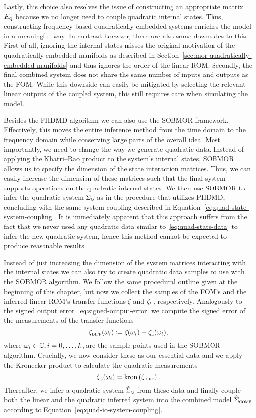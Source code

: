Lastly, this choice also resolves the issue of constructing an appropriate matrix $E_{\textnormal{\scshape q}}$ because we no longer need to couple quadratic internal states.
Thus, constructing frequency-based quadratically embedded systems enriches the model in a meaningful way.
In contrast hoewver, there are also some downsides to this.
First of all, ignoring the internal states misses the original motivation of the quadratically embedded manifolds as described in Section~\ref{sec:mor-quadratically-embedded-manifolds} and thus ignores the order of the linear \ac{ROM}.
Secondly, the final combined system does not share the same number of inputs and outputs as the \ac{FOM}.
While this downside can easily be mitigated by selecting the relevant linear outputs of the coupled system, this still requires care when simulating the model.

Besides the \ac{PHDMD} algorithm we can also use the \ac{SOBMOR} framework.
Effectively, this moves the entire inference method from the time domain to the frequency domain while conserving large parts of the overall idea.
Most importantly, we need to change the way we generate quadratic data.
Instead of applying the Khatri--Rao product to the system's internal states, \ac{SOBMOR} allows us to specify the dimension of the state interaction matrices.
Thus, we can easily increase the dimension of these matrices such that the final system supports operations on the quadratic internal states.
We then use \ac{SOBMOR} to infer the quadratic system $\Sigma_{\textnormal{\scshape q}}$ as in the procedure that utilizes \ac{PHDMD}, concluding with the same system coupling described in Equation~\eqref{eq:quad-state-system-coupling}.
It is immediately apparent that this approach suffers from the fact that we never used any quadratic data similar to~\eqref{eq:quad-state-data} to infer the new quadratic system, hence this method cannot be expected to produce reasonable results.

Instead of just increasing the dimension of the system matrices interacting with the internal states we can also try to create quadratic data samples to use with the \ac{SOBMOR} algorithm.
We follow the same procedural outline given at the beginning of this chapter, but now we collect the samples of the \ac{FOM}'s and the inferred linear \ac{ROM}'s transfer functions $\zeta$ and $\zeta_{\textnormal{\scshape l}}$, respectively.
Analogously to the signed output error~\eqref{eq:signed-output-error} we compute the signed error of the  measurements of the transfer functions
\begin{equation*}
    \zeta_{\textnormal{\scshape diff}}(\omega_i) \coloneqq \zeta(\omega_i) - \zeta_{\textnormal{\scshape l}}(\omega_i),
\end{equation*}
where $\omega_i \in \mathbb{C}, i = 0, \dots, k$, are the sample points used in the \ac{SOBMOR} algorithm.
Crucially, we now consider these as our essential data and we apply the Kronecker product to calculate the quadratic measurements
\begin{equation*}
    \zeta_{\textnormal{\scshape q}}(\omega_i) = \mathop{}\!\mathrm{kron}\left(\zeta_{\textnormal{\scshape diff}}\right).
\end{equation*}
Thereafter, we infer a quadratic system $\hat{\Sigma}_{\textnormal{\scshape q}}$ from these data and finally couple both the linear and the quadratic inferred system into the combined model $\hat{\Sigma}_{\textnormal{\scshape comb}}$ according to Equation~\eqref{eq:quad-io-system-coupling}.
